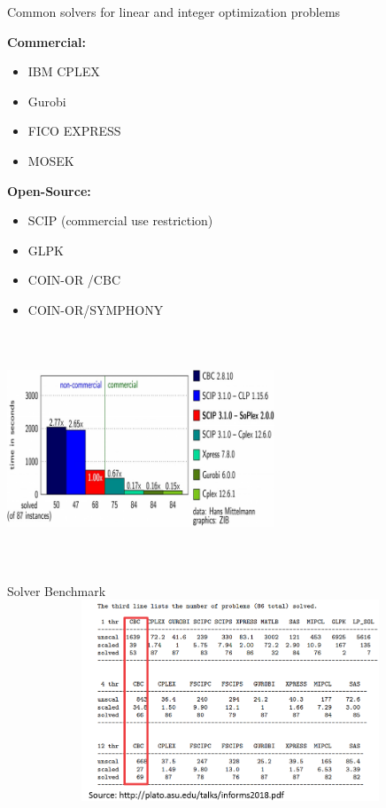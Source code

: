 \documentclass[xcolor=dvipsnames,aspectratio=169]{beamer}
\begin{document}
\begin{frame}{Common solvers for linear and integer optimization problems}
\begin{multicols}{2}

\textbf{Commercial:}
\begin{itemize}
    \item IBM CPLEX 
     \item Gurobi
     \item FICO EXPRESS
     \item MOSEK
\end{itemize}
    
\textbf{Open-Source:}

\begin{itemize}
    \item SCIP (commercial use restriction)
    \item GLPK 
    \item COIN-OR /CBC
    \item COIN-OR/SYMPHONY
\end{itemize}
\columnbreak
        \includegraphics[width=80mm, height = 70mm ]{benchmark.png}

\end{multicols}
\end{frame}


\begin{frame}{Solver Benchmark}
\includegraphics[width=140mm, height = 60mm]{benchmark2.PNG}
    
\end{frame}
\end{document}
